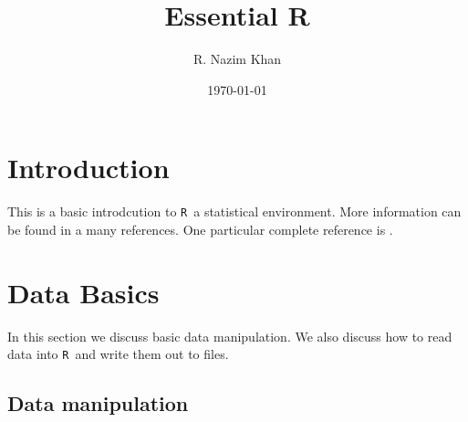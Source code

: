\documentclass[12pt,A4,makeidx]{article}\usepackage[]{graphicx}\usepackage[]{xcolor}
\title
{Essential R}
\author{R. Nazim Khan}
\date{\today}
\newcommand{\tR}{\texttt{R}}
\begin{document}

\maketitle
\section{Introduction}
This is a basic introdcution to \tR\, a statistical environment. More information can be found in a many references. One particular
complete reference is \cite{rbook}.


\section{Data Basics}
\label{data}
In this section we discuss basic data manipulation. We also discuss how to read data into \tR \ and 
write them out to files.

\subsection{Data manipulation}
\end{document}

